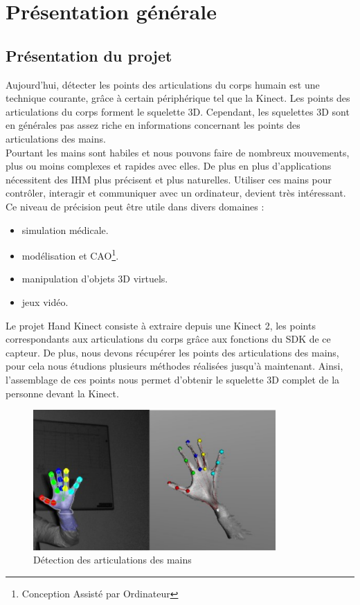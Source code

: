 \chapter{Présentation générale}



\section{Présentation du projet}
Aujourd'hui, détecter les points des articulations du corps humain 
est une technique courante, grâce à certain périphérique tel que la 
Kinect. Les points des articulations du corps forment le squelette 3D. 
Cependant, les squelettes 3D sont en générales pas assez riche en 
informations concernant les points des articulations des mains.\\

Pourtant les mains sont habiles et nous pouvons faire de nombreux 
mouvements, plus ou moins complexes et rapides avec elles. De plus en 
plus d'applications nécessitent des IHM plus précisent et plus 
naturelles. Utiliser ces mains pour contrôler, interagir et communiquer 
avec un ordinateur, devient très intéressant. Ce niveau de 
précision peut être utile dans divers domaines :
\begin{itemize}
  \item simulation médicale.
  \item modélisation et CAO\footnote{Conception Assisté par Ordinateur}.
  \item manipulation d'objets 3D virtuels.
  \item jeux vidéo.\\
\end{itemize}

Le projet \og Hand Kinect \fg consiste à extraire depuis une Kinect 2, 
les points correspondants aux articulations du corps grâce aux 
fonctions du SDK de ce capteur. De plus, nous devons récupérer les 
points des articulations des mains, pour cela nous étudions plusieurs 
méthodes réalisées jusqu'à maintenant. Ainsi, l'assemblage de ces points 
nous permet d'obtenir le squelette 3D complet de la personne devant la 
Kinect.\\

\begin{figure}[H]
  \begin{center}
    \includegraphics[width=350px]{images/joint_detection.png}
    \caption{Détection des articulations des mains}
  \end{center}
\end{figure}

